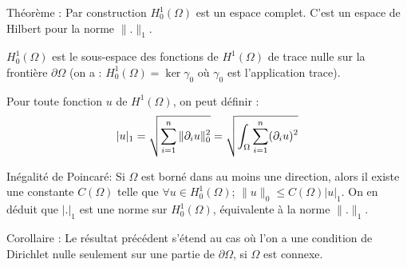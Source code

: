 \medskip
Théorème : Par construction $H^1_0(\Omega)$ est un espace complet. 
C'est un espace de Hilbert pour la norme $\|.\|_ 1$.

\medskip
$H^1_0(\Omega)$ est le sous-espace des fonctions de $H^1(\Omega)$ de trace nulle 
sur la frontière $\partial\Omega$ (on a : $H^1_0(\Omega)=\ker\gamma_0$ où $\gamma_0$
est l'application trace).

\medskip
Pour toute fonction $u$ de $H^1(\Omega)$, on peut définir :
\[
|u|_1=\sqrt{\displaystyle\sum_{i=1}^n\|\partial_i u\|_ 0^2} =
\sqrt{\displaystyle\int_\Omega\displaystyle\sum_{i=1}^n (\partial_i u)^2}
\]

\medskip
Inégalité de Poincaré:
Si $\Omega$ est borné dans au moins une direction, alors il
existe une constante $C(\Omega)$ telle que $\forall u\in H^1_0(\Omega)$; 
$\|u\|_0 \le C(\Omega) |u|_1$.
On en déduit que $|.|_1$ est une norme sur $H^1_0(\Omega)$, équivalente à 
la norme $\|.\|_1$.

\medskip
Corollaire : 
Le résultat précédent s'étend au cas où l'on a une condition de Dirichlet nulle
seulement sur une partie de $\partial\Omega$, si $\Omega$ est connexe.


